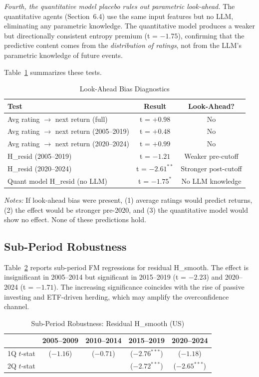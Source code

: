 \documentclass[12pt,a4paper]{article}
\begin{document}
\textit{Fourth, the quantitative model placebo rules out parametric look-ahead.} The quantitative agents (Section~6.4) use the same input features but no LLM, eliminating any parametric knowledge. The quantitative model produces a weaker but directionally consistent entropy premium (t = $-1.75$), confirming that the predictive content comes from the \textit{distribution of ratings}, not from the LLM's parametric knowledge of future events.

Table~\ref{tab:lookahead} summarizes these tests.

\begin{table}[H]
\centering
\caption{Look-Ahead Bias Diagnostics}
\label{tab:lookahead}
\small
\begin{tabular}{lcc}
\toprule
Test & Result & Look-Ahead? \\
\midrule
Avg rating $\rightarrow$ next return (full) & t = $+0.98$ & No \\
Avg rating $\rightarrow$ next return (2005--2019) & t = $+0.48$ & No \\
Avg rating $\rightarrow$ next return (2020--2024) & t = $+0.99$ & No \\
\midrule
H\_resid (2005--2019) & t = $-1.21$ & Weaker pre-cutoff \\
H\_resid (2020--2024) & t = $-2.61^{**}$ & Stronger post-cutoff \\
\midrule
Quant model H\_resid (no LLM) & t = $-1.75^{*}$ & No LLM knowledge \\
\bottomrule
\end{tabular}
\end{table}
\noindent\textit{Notes:} If look-ahead bias were present, (1) average ratings would predict returns, (2) the effect would be stronger pre-2020, and (3) the quantitative model would show no effect. None of these predictions hold.

\subsection{Sub-Period Robustness}

Table~\ref{tab:subperiod} reports sub-period FM regressions for residual H\_smooth. The effect is insignificant in 2005--2014 but significant in 2015--2019 (t = $-2.23$) and 2020--2024 (t = $-1.71$). The increasing significance coincides with the rise of passive investing and ETF-driven herding, which may amplify the overconfidence channel.

\begin{table}[H]
\centering
\caption{Sub-Period Robustness: Residual H\_smooth (US)}
\label{tab:subperiod}
\small
\begin{tabular}{lcccc}
\toprule
 & 2005--2009 & 2010--2014 & 2015--2019 & 2020--2024 \\
\midrule
1Q $t$-stat & ($-1.16$) & ($-0.71$) & ($-2.76^{***}$) & ($-1.18$) \\
2Q $t$-stat & & & ($-2.72^{***}$) & ($-2.65^{***}$) \\
\bottomrule
\end{tabular}
\end{table}
\end{document}
